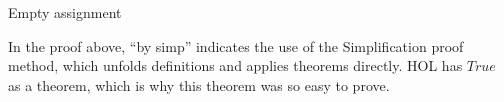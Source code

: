 \begin{isabellebody}
{  Empty assignment \color{black}%
}%
\endisatagproof
{\isafoldproof}%
%
\isadelimproof
%
\endisadelimproof
%
\begin{isamarkuptext}%
In the proof above, ``by simp'' indicates the use of the Simplification proof method, 
which unfolds definitions and applies theorems directly. HOL has $True$ as a theorem,
which is why this theorem was so easy to prove.%
\end{isamarkuptext}\isamarkuptrue%
%
\isadelimtheory
%
\endisadelimtheory
%
\isatagtheory
%
\endisatagtheory
{\isafoldtheory}%
%
\isadelimtheory
%
\endisadelimtheory
%
\end{isabellebody}%
\endinput
